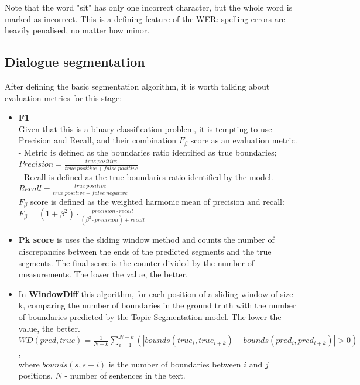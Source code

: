 \documentclass[PMI,VKR]{HSEUniversity}
\begin{document}
Note that the word "sit" has only one incorrect character, but the whole word is marked as incorrect.
This is a defining feature of the WER: spelling errors are heavily penalised, no matter how minor.

\subsection{Dialogue segmentation}

After defining the basic segmentation algorithm, it is worth talking about evaluation metrics for this stage:
\begin{itemize}
    \item \textbf{F1}\\
    Given that this is a binary classification problem, it is tempting to use Precision and Recall, and their combination $F_{\beta}$ score as an evaluation metric. \\ 
     - Metric is defined as the boundaries ratio identified as true boundaries; \\
       $Precision = \frac{true \: positive}{true \: positive + false \: positive}$ \\
     - Recall is defined as the true boundaries ratio identified by the model. \\
       $Recall = \frac{true \: positive}{true \: positive + false \: negative}$ \\
    $F_{\beta}$ score is defined as the weighted harmonic mean of precision and recall: \\
    $F_{\beta} = (1 + \beta^{2}) \cdot \frac{precision \cdot recall}{(\beta^{2} \cdot precision) + recall}$
    \item \textbf{Pk score} \cite{pk:1999} is uses the sliding window method and counts the number of discrepancies between the ends of the predicted segments and the true segments. The final score is the counter divided by the number of measurements. The lower the value, the better.
    \item In \textbf{WindowDiff} \cite{wd:2002} this algorithm, for each position of a sliding window of size k, comparing the number of boundaries in the ground truth with the number of boundaries predicted by the Topic Segmentation model. The lower the value, the better.\\
    $WD(pred, true) = \frac{1}{N - k}\sum_{i = 1}^{N - k}(\left\lvert bounds(true_{i}, true_{i + k}) - bounds(pred_{i}, pred_{i + k}) \right\rvert > 0)$, \\ 
    where $bounds(s, s + i)$ is the number of boundaries between $i$ and $j$ positions, $N$ - number of sentences in the text.
\end{itemize} 
\end{document}
